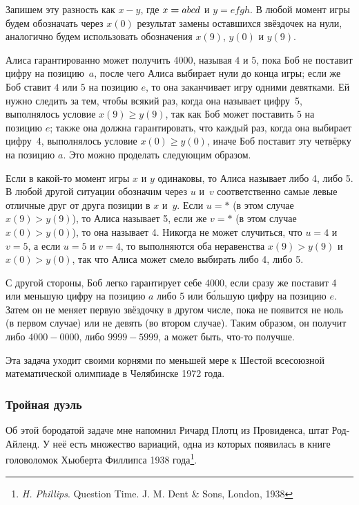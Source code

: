 \documentclass[twoside]{book}
\begin{document}
Запишем эту разность как $x-y$, где $x\hm=abcd$ и $y=efgh$.
В любой момент игры будем обозначать через $x(0)$ результат замены оставшихся звёздочек на нули, аналогично будем использовать обозначения $x(9)$, $y(0)$ и $y(9)$.

Алиса гарантированно может получить 4000, называя $4$ и $5$, пока Боб не поставит цифру на позицию~$a$, после чего Алиса выбирает нули до конца игры;
если же Боб ставит $4$ или $5$ на позицию $e$, то она заканчивает игру одними девятками.
Ей нужно следить за тем, чтобы всякий раз, когда она называет цифру~5, выполнялось условие $x(9)\ge y(9)$, так как Боб может поставить $5$ на позицию $e$;
также она должна гарантировать, что каждый раз, когда она выбирает цифру~4, выполнялось условие $x(0)\ge y(0)$, иначе Боб поставит эту четвёрку на позицию $a$.
Это можно проделать следующим образом.

Если в какой-то момент игры $x$ и $y$ одинаковы, то Алиса называет либо 4, либо 5.
В любой другой ситуации обозначим через $u$ и~$v$ соответственно самые левые отличные друг от друга позиции в $x$ и~$y$.
Если $u=*$ (в этом случае $x(9)> y(9)$), то Алиса называет 5, если же $v=*$ (в этом случае $x(0)> y(0)$), то она называет 4.
Никогда не может случиться, что $u=4$ и $v=5$, а если $u=5$ и $v=4$, то выполняются оба неравенства $x(9)> y(9)$ и $x(0)> y(0)$, так что Алиса может смело выбирать либо 4, либо 5.

С другой стороны, Боб легко гарантирует себе 4000, если сразу же поставит 4 или меньшую цифру на позицию $a$ либо 5 или б\'{о}льшую цифру на позицию $e$.
Затем он не меняет первую звёздочку в другом числе, пока не появится не ноль (в первом случае) или не девять (во втором случае).
Таким образом, он получит либо $4000-0000$, либо $9999-5999$, а может быть, что-то получше.
\heart

Эта задача уходит своими корнями по меньшей мере к Шестой всесоюзной математической олимпиаде в Челябинске 1972 года.

\subsubsection*{Тройная дуэль}%

Об этой бородатой задаче мне напомнил Ричард Плотц из Провиденса, штат Род-Айленд.
У неё есть множество вариаций, одна из которых появилась в книге головоломок Хьюберта Филлипса 1938 года\footnote{\emph{H. Phillips}. {Question Time}. J. M. Dent \& Sons, London, 1938}.
\end{document}
